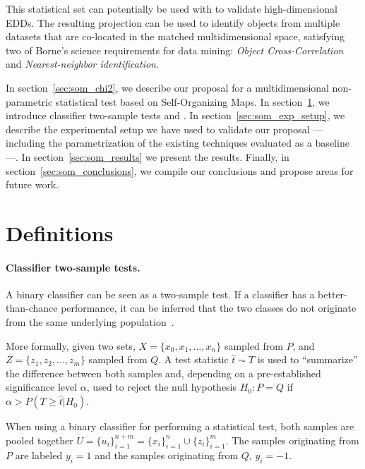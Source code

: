 This statistical set can potentially be used with \PresQ to validate
high-dimensional \glspl{EDD}. The resulting projection can be used to identify objects
from multiple datasets that are co-located in the matched multidimensional space, satisfying
two of Borne's science requirements for data mining: \emph{Object Cross-Correlation} and
\emph{Nearest-neighbor identification}.

In section~\ref{sec:som_chi2}, we describe our proposal
for a multidimensional non-parametric statistical test based on Self-Organizing Maps.
In section~\ref{sec:som_definitions}, we introduce classifier two-sample tests
and .
In section~\ref{sec:som_exp_setup}, we describe the experimental setup we have used
to validate our proposal --- including the parametrization of the existing techniques
evaluated as a baseline ---. In section~\ref{sec:som_results} we present the results.
Finally, in section~\ref{sec:som_conclusions}, we compile our conclusions and propose areas for future
work.


\section{Definitions}
\label{sec:som_definitions}

\paragraph{Classifier two-sample tests.}
\label{sec:som_classifier2sample}
A binary classifier can be seen as a two-sample test. If a classifier has a better-than-chance
performance, it can be inferred that the two classes do not originate from the same underlying
population~\cite{friedman2004multivariate}. 

More formally, given two sets, $X = \{x_0,x_1,\ldots,x_n\}$ sampled from $P$, and \linebreak
$Z = \{z_1,z_2,\ldots,z_m\}$ sampled from $Q$. A test statistic $\hat t \sim T$ is used to
``summarize'' the difference between both samples and, depending on a pre-established
significance level $\alpha$, used to reject the null hypothesis
$H_0: P = Q$ if $\alpha > P(T \ge \hat t | H_0)$.

When using a binary classifier for performing a statistical test, both samples are pooled
together $U = \{u_i\}_{i=1}^{n+m} = \{x_i\}_{i=1}^n \cup \{z_i\}_{i=1}^m$.
The samples originating from $P$ are labeled $y_i=1$ and the samples originating
from $Q$, $y_i=-1$.

